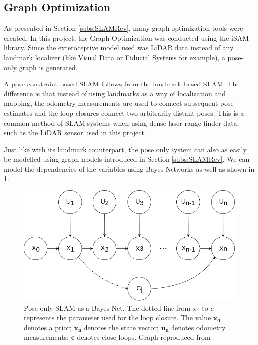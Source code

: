 \documentclass[11pt]{article}
\begin{document}
	\subsection{Graph Optimization}
	\label{subs:GraphOpt}

As presented in Section \ref{subs:SLAMRev}, many graph optimization tools were created. In this project, the Graph Optimization was conducted using the iSAM library. Since the exteroceptive model used was LiDAR data instead of any landmark localizer (like Visual Data or Fiducial Systems for example), a pose-only graph is generated.

A pose constraint-based SLAM follows from the landmark based SLAM. The difference is that instead of using landmarks as a way of localization and mapping, the odometry measurements are used to connect subsequent pose estimates and the loop closures connect two arbitrarily distant poses. This is a common method of SLAM systems when using dense laser range-finder data, such as the LiDAR sensor used in this project. 

Just like with its landmark counterpart, the pose only system can also as easily be modelled using graph models introduced in Section \ref{subs:SLAMRev}. We can model the dependencies of the variables using Bayes Networks as well as shown in \ref{fig:slam2}.
	
\begin{figure}
\begin{minipage}{0.65\textwidth}
\centering
\includegraphics[width=\textwidth]{BayesNetSLAMPoseOnly}
\end{minipage} \hfill
\begin{minipage}{0.35\textwidth}
\centering
\caption{Pose only SLAM as a Bayes Net. The dotted line from $x_1$ to $c$ represents the parameter used for the loop closure. The value $\mathbf{x_0}$ denotes a prior; $\mathbf{x_n}$ denotes the state vector; $\mathbf{u_n}$ denotes odometry measurements; $\mathbf{c}$ denotes close loops. Graph reproduced from \cite{Kaess08tro}}
\label{fig:slam2}
\end{minipage}				
\end{figure}
\end{document}
